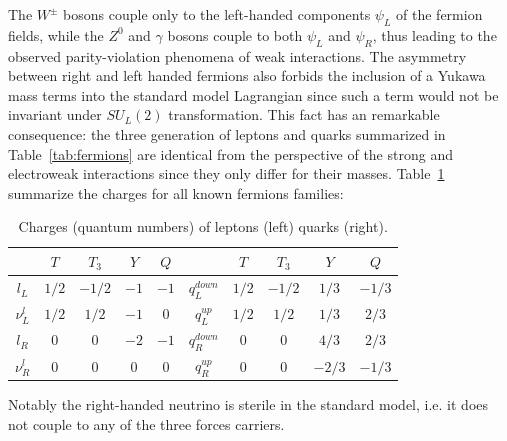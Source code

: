 The $W^{\pm}$ bosons couple only to the left-handed components $\psi_{L}$ of the fermion fields,
while the $Z^{0}$ and $\gamma$ bosons couple to both $\psi_L$ and
$\psi_R$, thus leading to the observed parity-violation phenomena of weak interactions.
The asymmetry between right and left handed fermions also forbids the inclusion of a
Yukawa mass terms into the standard model Lagrangian since such a term would not be invariant under $SU_L(2)$
transformation.
This fact has an remarkable consequence: the three generation of leptons and quarks summarized
in Table~\ref{tab:fermions} are identical from the perspective of the strong and electroweak interactions
since they only differ for their masses.
Table~\ref{tab:charges} summarize the charges for all known fermions families: 
\begin{table}[ht]
  \begin{center}
    \begin{tabular}{|c|c|c|c|c||c|c|c|c|c|}
      \hline
      & $T$
      & $T_3$
      & $Y$
      & $Q$
        &
      & $T$
      & $T_3$
      & $Y$
      & $Q$ \\
          \hline 
      $l_L$ & $1/2$ & $-1/2$ & $-1$ & $-1$  & $q_L^{down}$ & $1/2$ & $-1/2$ & $1/3$ & $-1/3$ \\      
      $\nu_L^l$ & $1/2$ & $1/2$ & $-1$ & $0$  & $q_L^{up}$ & $1/2$ & $1/2$ & $1/3$ & $2/3$ \\
      $l_R$ & $0$ & $0$ & $-2$ & $-1$  & $q_R^{down}$ & $0$ & $0$ & $4/3$ & $2/3$ \\
      $\nu_R^l$ & $0$ & $0$ & $0$ & $0$  & $q_R^{up}$ & $0$ & $0$ & $-2/3$ & $-1/3$ \\
      \hline
    \end{tabular}
  \end{center}
  \caption{Charges (quantum numbers) of leptons (left) quarks (right).}
  \label{tab:charges}
\end{table}

Notably the right-handed neutrino is sterile in the standard model, i.e. it does not couple to
any of the three forces carriers. 

